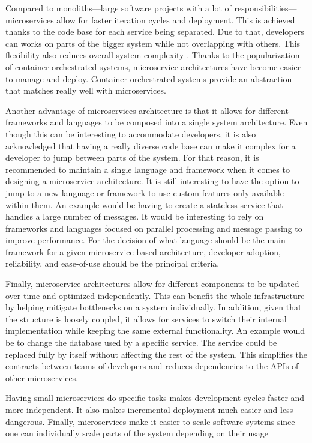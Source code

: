 Compared to monoliths---large software projects with a lot of responsibilities---microservices allow for faster iteration cycles and deployment. This is achieved thanks to the code base for each service being separated. Due to that, developers can works on parts of the bigger system while not overlapping with others. This flexibility also reduces overall system complexity \cite{microservices}. Thanks to the popularization of container orchestrated systems, microservice architectures have become easier to manage and deploy. Container orchestrated systems provide an abstraction that matches really well with microservices. 

Another advantage of microservices architecture is that it allows for different frameworks and languages to be composed into a single system architecture. Even though this can be interesting to accommodate developers, it is also acknowledged that having a really diverse code base can make it complex for a developer to jump between parts of the system. For that reason, it is recommended to maintain a single language and framework when it comes to designing a microservice architecture. It is still interesting to have the option to jump to a new language or framework to use custom features only available within them. An example would be having to create a stateless service that handles a large number of messages. It would be interesting to rely on frameworks and languages focused on parallel processing and message passing to improve performance. For the decision of what language should be the main framework for a given microservice-based architecture, developer adoption, reliability, and ease-of-use should be the principal criteria.  

Finally, microservice architectures allow for different components to be updated over time and optimized independently. This can benefit the whole infrastructure by helping mitigate bottlenecks on a system individually. In addition, given that the structure is loosely coupled, it allows for services to switch their internal implementation while keeping the same external functionality. An example would be to change the database used by a specific service. The service could be replaced fully by itself without affecting the rest of the system. This simplifies the contracts between teams of developers and reduces dependencies to the APIs of other microservices. 

Having small microservices do specific tasks makes development cycles faster and more independent. It also makes incremental deployment much easier and less dangerous. Finally, microservices make it easier to scale software systems since one can individually scale parts of the system depending on their usage


